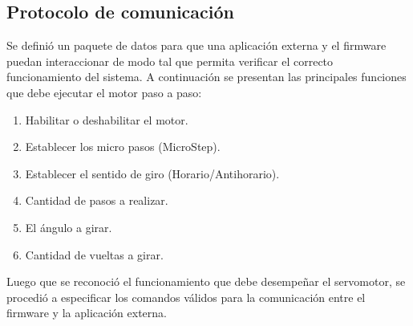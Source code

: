 \subsection{Protocolo de comunicación}
\label{subsec:Protocolo de comunicación}
Se definió un paquete de datos para que una aplicación externa y el firmware puedan interaccionar de modo tal que permita verificar el correcto funcionamiento del sistema. 
A continuación se presentan las principales funciones que debe ejecutar el motor paso a paso:

\begin{enumerate}
\item Habilitar o deshabilitar el motor.
\item Establecer los micro pasos (MicroStep).
\item Establecer el sentido de giro (Horario/Antihorario).
\item Cantidad de pasos a realizar.
\item El ángulo a girar.
\item Cantidad de vueltas a girar.
\end{enumerate}

Luego que se reconoció el funcionamiento que debe desempeñar el servomotor, se procedió a especificar los comandos válidos para la comunicación entre el firmware y la aplicación externa.

